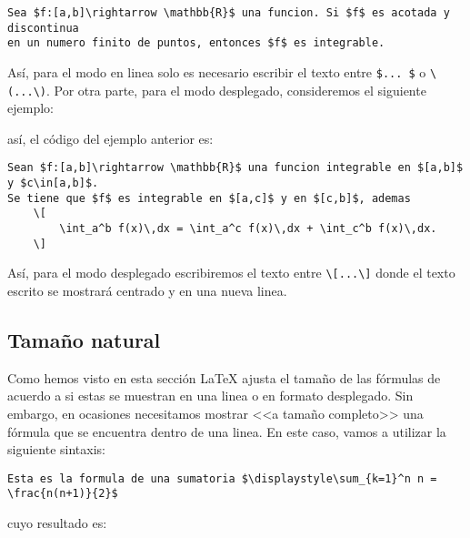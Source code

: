 \documentclass[a4,10pt]{aleph-notas}
\theoremstyle{definition}
\theoremstyle{plain}
\begin{document}
\begin{lstlisting}[frame=single]
Sea $f:[a,b]\rightarrow \mathbb{R}$ una funcion. Si $f$ es acotada y discontinua
en un numero finito de puntos, entonces $f$ es integrable.
\end{lstlisting}

Así, para el modo en linea solo es necesario escribir el texto entre \verb"$... $" o \verb"\(...\)". Por otra parte, para el modo desplegado, consideremos el siguiente ejemplo:

\begin{center}
{ \fboxsep 12pt
 }
\end{center}

así, el código del ejemplo anterior es:

\begin{lstlisting}[frame=single]
Sean $f:[a,b]\rightarrow \mathbb{R}$ una funcion integrable en $[a,b]$ y $c\in[a,b]$.
Se tiene que $f$ es integrable en $[a,c]$ y en $[c,b]$, ademas
    \[
        \int_a^b f(x)\,dx = \int_a^c f(x)\,dx + \int_c^b f(x)\,dx. 
    \]
\end{lstlisting}

Así, para el modo desplegado escribiremos el texto entre \verb"\[...\]" donde el texto escrito se mostrará centrado y en una nueva linea.

\subsection{Tamaño natural}

Como hemos visto en esta sección \LaTeX{} ajusta el tamaño de las fórmulas de acuerdo a si estas se muestran en una linea o en formato desplegado. Sin embargo, en ocasiones necesitamos mostrar <<a tamaño completo>> una fórmula que se encuentra dentro de una linea. En este caso, vamos a utilizar la siguiente sintaxis:

\begin{lstlisting}[frame=single]
Esta es la formula de una sumatoria $\displaystyle\sum_{k=1}^n n = \frac{n(n+1)}{2}$
\end{lstlisting}

\noindent
cuyo resultado es:
\end{document}
